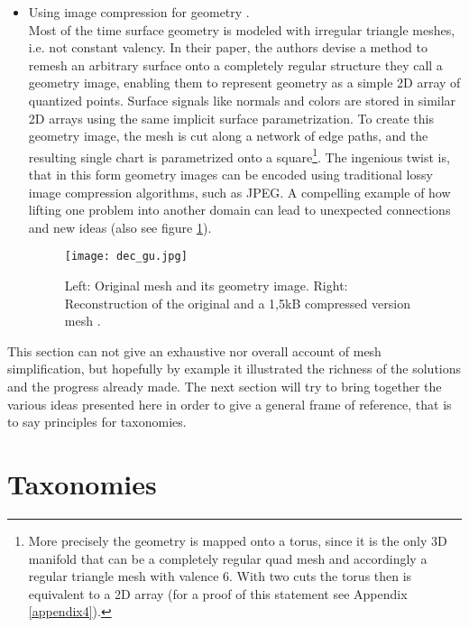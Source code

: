 \begin{itemize}
    \item Using image compression for geometry \citep[cf.][]{Gu2002}.\\
Most of the time surface geometry is modeled with irregular triangle meshes, i.e. not constant valency. In their paper, the authors devise a method to remesh an arbitrary surface onto a completely regular structure they call a geometry image, enabling them to represent geometry as a simple 2D array of quantized points. Surface signals like normals and colors are stored in similar 2D arrays using the same implicit surface parametrization. To create this geometry image, the mesh is cut along a network of edge paths, and the resulting single chart is parametrized onto a square\footnote{ More precisely the geometry is mapped onto a torus, since it is the only 3D manifold that can be a completely regular quad mesh and accordingly a regular triangle mesh with valence 6. With two cuts the torus then is equivalent to a 2D array (for a proof of this statement see Appendix \ref{appendix4}).}. The ingenious twist is, that in this form geometry images can be encoded using traditional lossy image compression algorithms, such as JPEG.
A compelling example of how lifting one problem into another domain can lead to unexpected connections and new ideas (also see figure \ref{fig:dec_gu}).
\begin{figure}[ht]
\centering
\texttt{[image: dec\_gu.jpg]}
\caption{Left: Original mesh and its geometry image. Right: Reconstruction of the original and a 1,5kB compressed version mesh \citep[][p.356]{Gu2002}.}
\label{fig:dec_gu}
\end{figure}
\end{itemize}
This section can not give an exhaustive nor overall account of mesh simplification, but hopefully by example it illustrated the richness of the solutions and the progress already made.
The next section will try to bring together the various ideas presented here in order to give a general frame of reference, that is to say principles for taxonomies.

\newpage	
\section{Taxonomies}
\label{simplification3}

